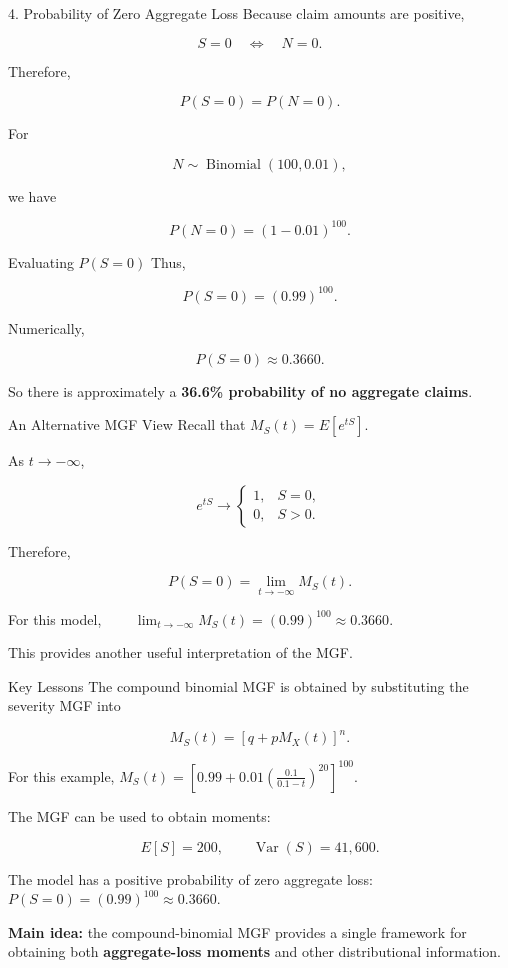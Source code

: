 \documentclass[
  ignorenonframetext,
  aspectratio=169,
]{beamer}
\begin{document}
\begin{frame}{4. Probability of Zero Aggregate Loss}
\protect{}\label{probability-of-zero-aggregate-loss}
Because claim amounts are positive,

\[
S=0
\quad\Longleftrightarrow\quad
N=0.
\]

Therefore,

\[
P(S=0)=P(N=0).
\]

For

\[
N\sim\operatorname{Binomial}(100,0.01),
\]

we have

\[
P(N=0)
=
(1-0.01)^{100}.
\]
\end{frame}

\begin{frame}{Evaluating \(P(S=0)\)}
\protect{}\label{evaluating-ps0}
Thus,

\[
P(S=0)
=
(0.99)^{100}.
\]

Numerically,

\[
\boxed{P(S=0)\approx0.3660}.
\]

So there is approximately a \textbf{36.6\% probability of no aggregate
claims}.
\end{frame}

\begin{frame}{An Alternative MGF View}
\protect{}\label{an-alternative-mgf-view}
Recall that \(M_S(t)=E[e^{tS}].\)

As \(t\to-\infty\),

\[
e^{tS}\to
\begin{cases}
1, & S=0,\\
0, & S>0.
\end{cases}
\]

Therefore,

\[
P(S=0)
=
\lim_{t\to-\infty}M_S(t).
\]

For this model,
\(\qquad \lim_{t\to-\infty}M_S(t)=(0.99)^{100} \approx0.3660.\)

This provides another useful interpretation of the MGF.
\end{frame}

\begin{frame}{Key Lessons}
\protect{}\label{key-lessons}
The compound binomial MGF is obtained by substituting the severity MGF
into

\[
M_S(t)=\left[q+pM_X(t)\right]^n.
\]

For this example,
\(\boxed{M_S(t)=\left[0.99+0.01\left(\frac{0.1}{0.1-t}\right)^{20}\right]^{100}}.\)

The MGF can be used to obtain moments:

\[
E[S]=200,
\qquad
\operatorname{Var}(S)=41{,}600.
\]

The model has a positive probability of zero aggregate loss:
\(P(S=0)=(0.99)^{100}\approx0.3660.\)

\textbf{Main idea:} the compound-binomial MGF provides a single
framework for obtaining both \textbf{aggregate-loss moments} and other
distributional information.
\end{frame}
\end{document}
